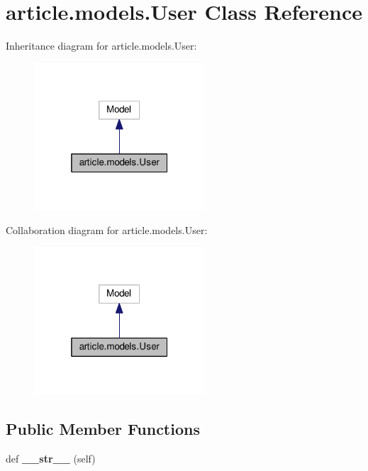 \hypertarget{classarticle_1_1models_1_1User}{}\section{article.\+models.\+User Class Reference}
\label{classarticle_1_1models_1_1User}


Inheritance diagram for article.\+models.\+User\+:
\nopagebreak
\begin{figure}[H]
\begin{center}
\leavevmode
\includegraphics[width=181pt]{classarticle_1_1models_1_1User__inherit__graph}
\end{center}
\end{figure}


Collaboration diagram for article.\+models.\+User\+:
\nopagebreak
\begin{figure}[H]
\begin{center}
\leavevmode
\includegraphics[width=181pt]{classarticle_1_1models_1_1User__coll__graph}
\end{center}
\end{figure}
\subsection*{Public Member Functions}
\begin{DoxyCompactItemize}
\item 
\hypertarget{classarticle_1_1models_1_1User_aea047e9228c3645d2b1a338bcb5cefc5}{}def {\bfseries \+\_\+\+\_\+str\+\_\+\+\_\+} (self)\label{classarticle_1_1models_1_1User_aea047e9228c3645d2b1a338bcb5cefc5}

\end{DoxyCompactItemize}
